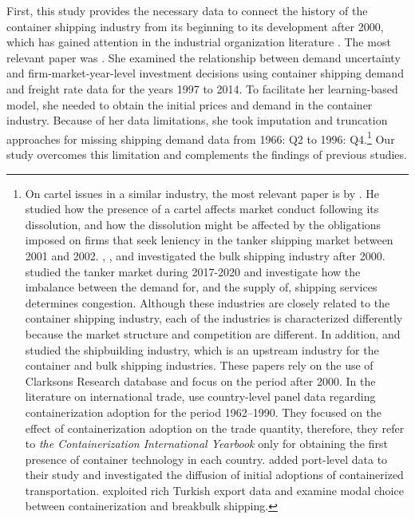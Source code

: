\documentclass[11pt]{article}
\begin{document}
First, this study provides the necessary data to connect the history of the container shipping industry from its beginning to its development after 2000, which has gained attention in the industrial organization literature  \citep{aguirregabiria2021dynamic}. The most relevant paper was \cite{jeon2022learning}. She examined the relationship between demand uncertainty and firm-market-year-level investment decisions using container shipping demand and freight rate data for the years 1997 to 2014. To facilitate her learning-based model, she needed to obtain the initial prices and demand in the container industry. Because of her data limitations, she took imputation and truncation approaches for missing shipping demand data from 1966: Q2 to 1996: Q4.\footnote{On cartel issues in a similar industry, the most relevant paper is by \cite{asker2010leniency}. He studied how the presence of a cartel affects market conduct following its dissolution, and how the dissolution might be affected by the obligations imposed on firms that seek leniency in the tanker shipping market between 2001 and 2002. \cite{kalouptsidi2014aer}, \cite{brancaccio2020geography}, and \cite{greenwood2015waves} investigated the bulk shipping industry after 2000. \cite{bai2021congestion} studied the tanker market during 2017-2020 and investigate how the imbalance between the demand for, and the supply of, shipping services
determines congestion. Although these industries are closely related to the container shipping industry, each of the industries is characterized differently because the market structure and competition are different. In addition, \cite{kalouptsidi2017res} and \cite{barwick2019china} studied the shipbuilding industry, which is an upstream industry for the container and bulk shipping industries. These papers rely on the use of Clarksons Research database and focus on the period after 2000. In the literature on international trade, \cite{bernhofen2016estimating} use country-level panel data regarding containerization adoption for the period 1962–1990. They focused on the effect of containerization adoption on the trade quantity, therefore, they refer to \textit{the Containerization International Yearbook} only for obtaining the first presence of container technology in each country. \cite{rua2014diffusion} added port-level data to their study and investigated the diffusion of initial adoptions of containerized transportation. \cite{cocsar2018shipping} exploited rich Turkish export data and examine modal choice between containerization and breakbulk shipping.} Our study overcomes this limitation and complements the findings of previous studies.
\end{document}
